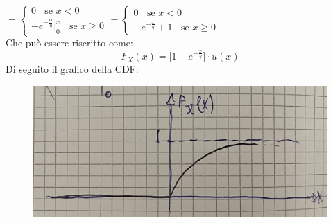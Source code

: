 \documentclass{article}
\begin{document}
$= 
\begin{cases}
0 \;\;\text{ se } x<0 \\
-e^{- \frac \alpha \eta} \Big|_{0}^{x} \;\;\text{ se } x \geq 0
\end{cases}
=
\begin{cases}
0 \;\;\text{ se } x<0 \\
-e^{- \frac x \eta} +1 \;\;\text{ se } x \geq 0
\end{cases}$ \\
Che può essere riscritto come: 
\[F_X(x) = \Big[1 - e^{-\frac x \eta }\Big] \cdot u(x)\]
Di seguito il grafico della CDF:
\begin{figure}[ht]
\centering
\includegraphics[scale=0.10]{images/36.CDF_VA_exp.jpeg}
\end{figure}
\end{document}
